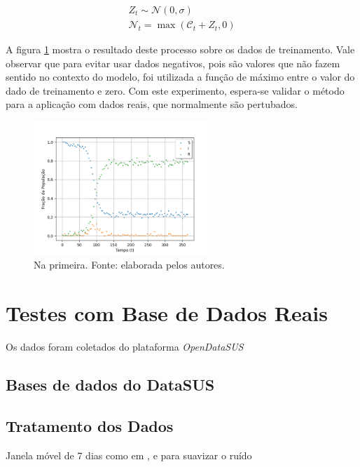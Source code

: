 \begin{eqnarray}\label{eq:ruido-gaussiano}
    Z_t \sim \mathcal{N}(0, \sigma) \\
    \mathcal{N}_t = \max(\mathcal{C}_t + Z_t, 0)  
\end{eqnarray}

A figura \ref{fig:dados-comruido} mostra o resultado deste processo sobre os dados
de treinamento. Vale observar que para evitar usar dados negativos, pois são valores
que não fazem sentido no contexto do modelo, foi utilizada a função de máximo
entre o valor do dado de treinamento e zero.
Com este experimento, espera-se validar o método para a aplicação com dados reais,
que normalmente são pertubados. 

\begin{figure}[htpb]
\centering
\includegraphics[width=0.6\textwidth]{figuras/runge-kutta-compartiments-data-sir-noisy.png}
\caption{Na primeira. Fonte: elaborada pelos autores.}
\label{fig:dados-comruido}
\end{figure}


\section{Testes com Base de Dados Reais}

Os dados foram coletados do plataforma \textit{OpenDataSUS} \cite{opendatasus}


\subsection{Bases de dados do DataSUS}

\subsection{Tratamento dos Dados}
Janela móvel de 7 dias como em \cite{han-etal:24-prim-artigo-alemanha},
\cite{long-etal:21-L2} e \cite{shamsara-etal:25-omicron} para suavizar o ruído

